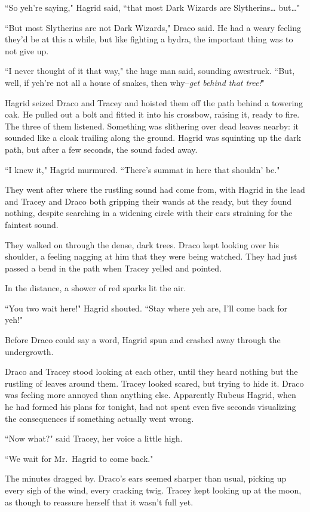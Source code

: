 ``So yeh're saying," Hagrid said, ``that most Dark Wizards are Slytherins{\ldots} but{\ldots}"

``But most Slytherins are not Dark Wizards," Draco said. He had a weary feeling they'd be at this a while, but like fighting a hydra, the important thing was to not give up.

``I never thought of it that way," the huge man said, sounding awestruck. ``But, well, if yeh're not all a house of snakes, then why\---\emph{get behind that tree!}"

Hagrid seized Draco and Tracey and hoisted them off the path behind a towering oak. He pulled out a bolt and fitted it into his crossbow, raising it, ready to fire. The three of them listened. Something was slithering over dead leaves nearby: it sounded like a cloak trailing along the ground. Hagrid was squinting up the dark path, but after a few seconds, the sound faded away.

``I knew it," Hagrid murmured. ``There's summat in here that shouldn' be."

They went after where the rustling sound had come from, with Hagrid in the lead and Tracey and Draco both gripping their wands at the ready, but they found nothing, despite searching in a widening circle with their ears straining for the faintest sound.

They walked on through the dense, dark trees. Draco kept looking over his shoulder, a feeling nagging at him that they were being watched. They had just passed a bend in the path when Tracey yelled and pointed.

In the distance, a shower of red sparks lit the air.

``You two wait here!" Hagrid shouted. ``Stay where yeh are, I'll come back for yeh!"

Before Draco could say a word, Hagrid spun and crashed away through the undergrowth.

Draco and Tracey stood looking at each other, until they heard nothing but the rustling of leaves around them. Tracey looked scared, but trying to hide it. Draco was feeling more annoyed than anything else. Apparently Rubeus Hagrid, when he had formed his plans for tonight, had not spent even five seconds visualizing the consequences if something actually went wrong.

``Now what?" said Tracey, her voice a little high.

``We wait for Mr.~Hagrid to come back."

The minutes dragged by. Draco's ears seemed sharper than usual, picking up every sigh of the wind, every cracking twig. Tracey kept looking up at the moon, as though to reassure herself that it wasn't full yet.

